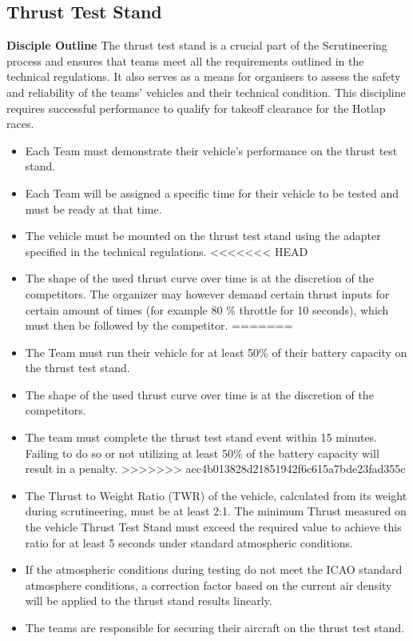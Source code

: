     \subsection{Thrust Test Stand}
    \textbf{Disciple Outline}
    The thrust test stand is a crucial part of the Scrutineering process and ensures that teams meet all the requirements outlined in the technical regulations. It also serves as a means for organisers to assess the safety and reliability of the teams' vehicles and their technical condition. This discipline requires successful performance to qualify for takeoff clearance for the Hotlap races.
    \begin{itemize}
      \item Each Team must demonstrate their vehicle's performance on the thrust test stand.
      \item Each Team will be assigned a specific time for their vehicle to be tested and must be ready at that time.
      \item The vehicle must be mounted on the thrust test stand using the adapter specified in the technical regulations.
<<<<<<< HEAD
      \item The shape of the used thrust curve over time is at the discretion of the competitors. The organizer may however demand certain thrust inputs for certain amount of times (for example 80 \% throttle for 10 seconds), which must then be followed by the competitor.
=======
      \item The Team must run their vehicle for at least 50\% of their battery capacity on the thrust test stand.
      \item The shape of the used thrust curve over time is at the discretion of the competitors.
      \item The team must complete the thrust test stand event within 15 minutes. Failing to do so or not utilizing at least 50\% of the battery capacity will result in a penalty.
>>>>>>> aec4b013828d21851942f6c615a7bde23fad355c
      \item The Thrust to Weight Ratio (TWR) of the vehicle, calculated from its weight during scrutineering, must be at least 2:1. The minimum Thrust measured on the vehicle Thrust Test Stand must exceed the required value to achieve this ratio for at least 5 seconds under standard atmospheric conditions.
      \item If the atmospheric conditions during testing do not meet the ICAO standard atmosphere conditions, a correction factor based on the current air density will be applied to the thrust stand results linearly.
      \item The teams are responsible for securing their aircraft on the thrust test stand.
    \end{itemize}



